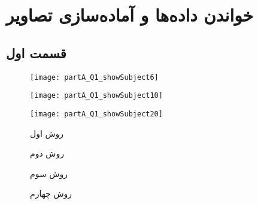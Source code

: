 \chapter{خواندن داده‌ها و آماده‌سازی تصاویر}

\ptext[1]

\section{قسمت اول}

\ptext[2]
\cite{fieldtrip-prepare_mesh_segmentation.m}

\begin{figure}[t!]
	\centering
	\removevspace
	\caption{}
	\label{fig:partA:Q1:showAtlas}
\end{figure}

\begin{figure}
	\centering
	\texttt{[image: partA\_Q1\_showSubject6]}
	\caption{}
	\label{fig:partaq1showsubject6}
\end{figure}
\begin{figure}
	\centering
	\texttt{[image: partA\_Q1\_showSubject10]}
	\caption{}
	\label{fig:partaq1showsubject10}
\end{figure}
\begin{figure}
	\centering
	\texttt{[image: partA\_Q1\_showSubject20]}
	\caption{}
	\label{fig:partaq1showsubject20}
\end{figure}




\begin{figure}[t!]
	\centering
	\removevspace
	\caption{روش اول}
	\label{fig:partA:Q2:method1-isosurface}
\end{figure}

\begin{figure}[t!]
	\centering
	\removevspace
	\caption{روش دوم}
	\label{fig:partA:Q2:method2-isosurface}
\end{figure}



\begin{figure}[t!]
	\centering
	\removevspace
	\caption{روش سوم}
	\label{fig:partA:Q2:method3-bwperim3}
\end{figure}


\begin{figure}[t!]
	\centering
	\removevspace
	\caption{روش چهارم}
	\label{fig:partA:Q2:method4-iso2mesh}
\end{figure}














